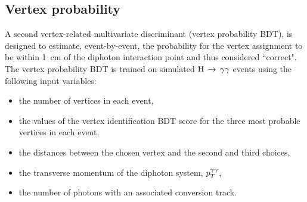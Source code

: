 \subsection{Vertex probability}

A second vertex-related multivariate discriminant (vertex probability BDT),
is designed to estimate, event-by-event, the probability for the vertex
assignment to be within \SI{1}{cm} of the diphoton interaction point
and thus considered ``correct".
The vertex probability BDT is trained on simulated $\mathrm{H}\,\rightarrow\,\gamma\gamma$ events using
the following input variables:
\begin{itemize}
        \item the number of vertices in each event,
        \item the values of the vertex identification BDT score for
                the three most probable vertices in each event,
        \item the distances between the chosen vertex and the second and
                third choices,
        \item the transverse momentum of the diphoton system, $p_T^{\gamma\gamma}$,
        \item the number of photons with an associated conversion track.
\end{itemize}

